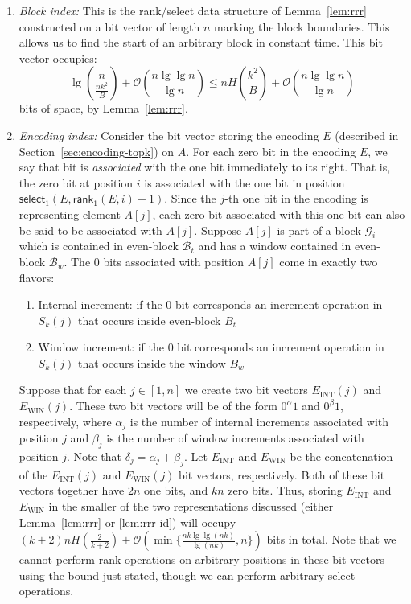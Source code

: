 \documentclass[runningheads]{llncs}
\def\rankop{\textsf{rank}}
\def\selop{\textsf{select}}
\newcommand{\Oh}{\mathcal{O}}
\begin{document}
\begin{enumerate}

\item \emph{Block index:} This is the rank/select data structure of
  Lemma~\ref{lem:rrr} constructed on a bit vector of length $n$
  marking the block boundaries.  This allows us to find the start of
  an arbitrary block in constant time. This bit vector occupies:
$$\lg\binom{n}{\frac{nk^2}{B}} + \Oh\left(\frac{n \lg \lg n }{ \lg n}\right) \le nH\left(\frac{k^2}{B}\right) +
  \Oh\left(\frac{n \lg \lg n }{ \lg n}\right)$$
\noindent 
bits of space, by Lemma~\ref{lem:rrr}.

\item \emph{Encoding index:} Consider the bit vector storing the
  encoding $E$ (described in Section~\ref{sec:encoding-topk}) on
  $A$. For each zero bit in the encoding $E$, we say that bit is
  \emph{associated} with the one bit immediately to its right.  That
  is, the zero bit at position $i$ is associated with the one bit in
  position $\selop_1(E,\rankop_1(E,i) + 1)$.  Since the $j$-th one bit
  in the encoding is representing element $A[j]$, each zero bit
  associated with this one bit can also be said to be associated with
  $A[j]$. Suppose $A[j]$ is part of a block $\mathcal{G}_i$ which is
  contained in even-block $\mathcal{B}_t$ and has a window contained
  in even-block $\mathcal{B}_w$.  The $0$ bits associated with
  position $A[j]$ come in exactly two flavors:

  \begin{enumerate}
    \item Internal increment: if the $0$ bit corresponds an increment
      operation in $S_k(j)$ that occurs inside even-block ${B}_t$
    \item Window increment: if the $0$ bit corresponds an increment
      operation in $S_k(j)$ that occurs inside the window ${B}_w$
  \end{enumerate}
  
  Suppose that for each $j \in [1,n]$ we create two bit vectors
  $E_{\text{INT}}(j)$ and $E_{\text{WIN}}(j)$.  These two bit vectors
  will be of the form $0^\alpha 1$ and $0^\beta 1$, respectively,
  where $\alpha_j$ is the number of internal increments associated
  with position $j$ and $\beta_j$ is the number of window increments
  associated with position $j$.  Note that $\delta_j = \alpha_j +
  \beta_j$. Let $E_{\text{INT}}$ and $E_{\text{WIN}}$ be the
  concatenation of the $E_{\text{INT}}(j)$ and $E_{\text{WIN}}(j)$ bit
  vectors, respectively.  Both of these bit vectors together have $2n$
  one bits, and $kn$ zero bits.  Thus, storing $E_{\text{INT}}$ and
  $E_{\text{WIN}}$ in the smaller of the two representations discussed
  (either Lemma~\ref{lem:rrr} or \ref{lem:rrr-id}) will occupy $(k+2)n
  H(\frac{2}{k+2}) + \Oh(\min\{\frac{nk \lg\lg(nk) }{\lg (nk)},n\})$ bits in
  total.  Note that we cannot perform rank operations on arbitrary
  positions in these bit vectors using the bound just stated, though
  we can perform arbitrary select operations.



\end{enumerate}
\end{document}
